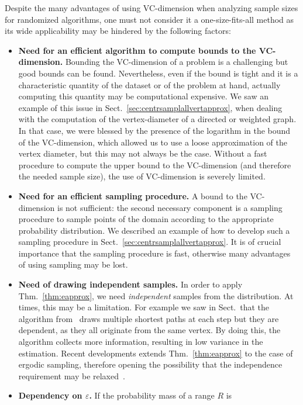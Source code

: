 Despite the many advantages of using VC-dimension when analyzing sample sizes
for randomized algorithms, one must not consider it a one-size-fits-all method
as its wide applicability may be hindered by the following factors:
\begin{itemize}
  \item{\bf Need for an efficient algorithm to compute bounds to the
    VC-dimension.} Bounding the VC-dimension of a problem is a challenging but
    good bounds can be found. Nevertheless, even if the bound is tight and it is a
    characteristic quantity of the dataset or of the problem at hand, actually
    computing this quantity may be computational expensive. We saw an example of
    this issue in Sect.~\ref{sec:centrsamplallvertapprox}, when dealing with the
    computation of the vertex-diameter of a directed or weighted graph. In that
    case, we were blessed by the presence of the logarithm in the bound of the
    VC-dimension, which allowed us to use a loose approximation of the vertex
    diameter, but this may not always be the case. Without a fast procedure to
    compute the upper bound to the VC-dimension (and therefore the needed sample
    size), the use of VC-dimension is severely limited.
  \item{\bf Need for an efficient sampling procedure.} A bound to the
    VC-dimension is not sufficient: the second necessary component is a sampling
    procedure to sample points of the domain according to the appropriate
    probability distribution. We described an example of how to develop such a
    sampling procedure in Sect.~\ref{sec:centrsamplallvertapprox}. It is of
    crucial importance that the sampling procedure is fast, otherwise many
    advantages of using sampling may be lost.
  \item{\bf Need of drawing independent samples.} In order to apply
    Thm.~\ref{thm:eapprox}, we need \emph{independent} samples from the
    distribution. At times, this may be a limitation. For example we saw in
    Sect.~ that the algorithm from~\citep{BrandesP07} draws multiple
    shortest paths at each step but they are dependent, as they all originate
    from the same vertex. By doing this, the algorithm collects more
    information, resulting in low variance in the estimation. Recent
    developments extends Thm.~\ref{thm:eapprox} to the case of ergodic
    sampling, therefore opening the possibility that the independence
    requirement may be relaxed~\citemissing.
  \item{\bf Dependency on $\varepsilon$.} If the probability mass of a range $R$ is

\end{itemize}
